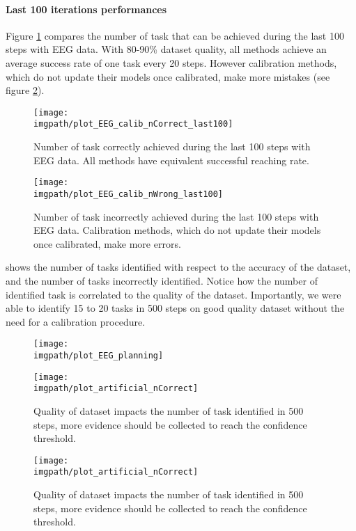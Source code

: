 \paragraph{Last 100 iterations performances}

Figure \ref{fig:nCorrectEEG_last100} compares the number of task that can be achieved during the last 100 steps with EEG data. With 80-90\% dataset quality, all methods achieve an average success rate of one task every 20 steps. However calibration methods, which do not update their models once calibrated, make more mistakes (see figure \ref{fig:nWrongEEG_last100}).

\begin{figure}[!ht]
\centering
\texttt{[image: \\imgpath/plot\_EEG\_calib\_nCorrect\_last100]}
\caption{Number of task correctly achieved during the last 100 steps with EEG data. All methods have equivalent successful reaching rate.}
\label{fig:nCorrectEEG_last100}
\end{figure} 

\begin{figure}[!ht]
\centering
\texttt{[image: \\imgpath/plot\_EEG\_calib\_nWrong\_last100]}
\caption{Number of task incorrectly achieved during the last 100 steps with EEG data. Calibration methods, which do not update their models once calibrated, make more errors.}
\label{fig:nWrongEEG_last100}
\end{figure} 

 shows the number of tasks identified with respect to the accuracy of the dataset, and the number of tasks incorrectly identified. Notice how the number of identified task is correlated to the quality of the dataset. Importantly, we were able to identify 15 to 20 tasks in 500 steps on good quality dataset without the need for a calibration procedure.


\begin{figure}[!ht]
    \centering
    \texttt{[image: \\imgpath/plot\_EEG\_planning]}
    \caption{}
    \label{fig:planning}
\end{figure} 

\begin{figure}[!ht]
    \centering
    \texttt{[image: \\imgpath/plot\_artificial\_nCorrect]}
    \caption{Quality of dataset impacts the number of task identified in 500 steps, more evidence should be collected to reach the confidence threshold.}
    \label{fig:nCorrectArtificial}
\end{figure} 


\begin{figure}[!ht]
    \centering
    \texttt{[image: \\imgpath/plot\_artificial\_nCorrect]}
    \caption{Quality of dataset impacts the number of task identified in 500 steps, more evidence should be collected to reach the confidence threshold.}
    \label{fig:nCorrectArtificial}
\end{figure} 